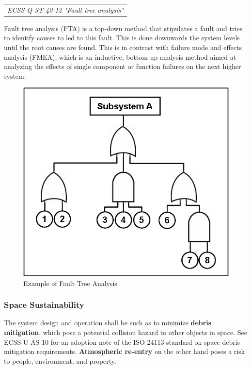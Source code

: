 \begin{tabular}{l}
\textit{ECSS-Q-ST-40-12 "Fault tree analysis" \cite{ECSS-Q-ST-40-12}}
\end{tabular}

Fault tree analysis (FTA) is a top-down method that stipulates a fault and tries to identify causes to led to this fault. This is done downwards the system levels until the root causes are found. This is in contrast with failure mode and effects analysis (FMEA), which is an inductive, bottom-up analysis method aimed at analyzing the effects of single component or function failures on the next higher system. 

\begin{figure}[h]
\centering\includegraphics[scale=1.0]{fig/example_of_fault_tree_analysis}
\caption{Example of Fault Tree Analysis}
\label{fig:Example of Fault Tree Analysis}
\end{figure}

\subsubsection{Space Sustainability}

The system design and operation shall be such as to minimize \textbf{debris mitigation}, which pose a potential collision hazard to other objects in space. See ECSS-U-AS-10 \cite{ECSS-U-AS-10} for an adoption note of the ISO 24113 standard on space debris mitigation requirements. \textbf{Atmospheric re-entry} on the other hand poses a risk to people, environment, and property.


